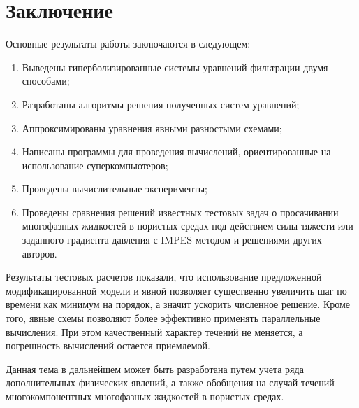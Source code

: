 \chapter*{Заключение}                       %


Основные результаты работы заключаются в следующем:
\begin{enumerate}
 \item Выведены гиперболизированные системы уравнений фильтрации двумя способами;
 \item Разработаны алгоритмы решения полученных систем уравнений;
 \item Аппроксимированы уравнения явными разностыми схемами;
 \item Написаны программы для проведения вычислений, ориентированные на использование суперкомпьютеров;
 \item Проведены вычислительные эксперименты;
 \item Проведены сравнения решений известных тестовых задач о просачивании многофазных жидкостей в пористых средах под действием силы тяжести или заданного градиента давления с IMPES-методом и решениями других авторов.
\end{enumerate}

Результаты тестовых расчетов показали, что использование предложенной модификацированной модели и явной позволяет существенно увеличить шаг по времени как минимум на порядок, а значит ускорить численное решение. Кроме того, явные схемы позволяют более эффективно применять параллельные вычисления.
При этом качественный характер течений не меняется, а погрешность вычислений остается приемлемой.

Данная тема в дальнейшем может быть разработана путем учета ряда дополнительных физических явлений, а также обобщения на случай течений многокомпонентных многофазных жидкостей в пористых средах.
